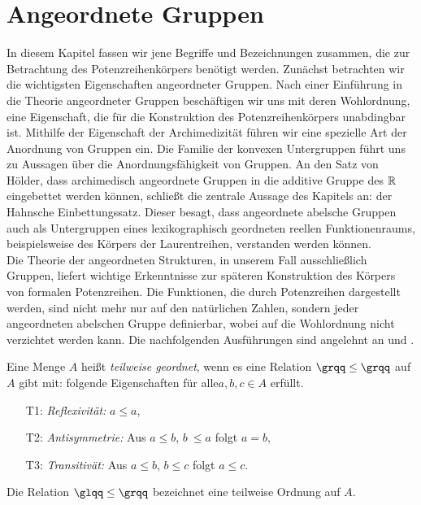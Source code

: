 \chapter{Angeordnete Gruppen}\label{chap2}
In diesem Kapitel fassen wir jene Begriffe und Bezeichnungen zusammen, die zur Betrachtung des Potenzreihenkörpers benötigt werden. Zunächst betrachten wir die wichtigsten Eigenschaften angeordneter Gruppen. Nach einer Einführung in die Theorie angeordneter Gruppen beschäftigen wir uns mit deren Wohlordnung, eine Eigenschaft, die für die Konstruktion des Potenzreihenkörpers unabdingbar ist. Mithilfe der Eigenschaft der Archimedizität führen wir eine spezielle Art der Anordnung von Gruppen ein. Die Familie der konvexen Untergruppen führt uns zu Aussagen über die Anordnungsfähigkeit von Gruppen. An den Satz von Hölder, dass archimedisch angeordnete Gruppen in die additive Gruppe des $\mathbb{R}$ eingebettet werden können,  schließt die zentrale Aussage des Kapitels an: der Hahnsche Einbettungssatz. Dieser besagt, dass angeordnete abelsche Gruppen auch als Untergruppen eines lexikographisch geordneten reellen Funktionenraums, beispielsweise des Körpers der Laurentreihen, verstanden werden können. \\
Die Theorie der angeordneten Strukturen, in unserem Fall ausschließlich Gruppen, liefert wichtige Erkenntnisse zur späteren Konstruktion des Körpers von formalen Potenzreihen. Die Funktionen, die durch Potenzreihen dargestellt werden, sind nicht mehr nur auf den natürlichen Zahlen, sondern jeder angeordneten abelschen Gruppe definierbar, wobei auf die Wohlordnung nicht verzichtet werden kann. 
Die nachfolgenden Ausführungen sind angelehnt an \cite[S. 21 - 28]{fuchs66} und \cite[S. 1 -  4]{priesscrampe83}.
%
%
\begin{defn}\label{defgs} 
Eine Menge $A$ heißt \textit{teilweise geordnet}, wenn es eine Relation $ \grqq\leq\grqq $ auf $A$ gibt mit: folgende Eigenschaften für alle$ a,b,c \in A$  erfüllt.
%
\begin{enumerate}
\item[T1:] \textit{Reflexivität: } $a \leq  a$,
\item[T2:] \textit{Antisymmetrie: } Aus $a \leq  b$, $b~ \leq a$ folgt $a = b$,
\item[T3:] \textit{Transitivät: } Aus $a \leq b$, $b \leq c$ folgt $a \leq c$.
\end{enumerate}
%
Die Relation $\glqq \leq\grqq$ bezeichnet eine teilweise Ordnung auf $A$.
\end{defn}
